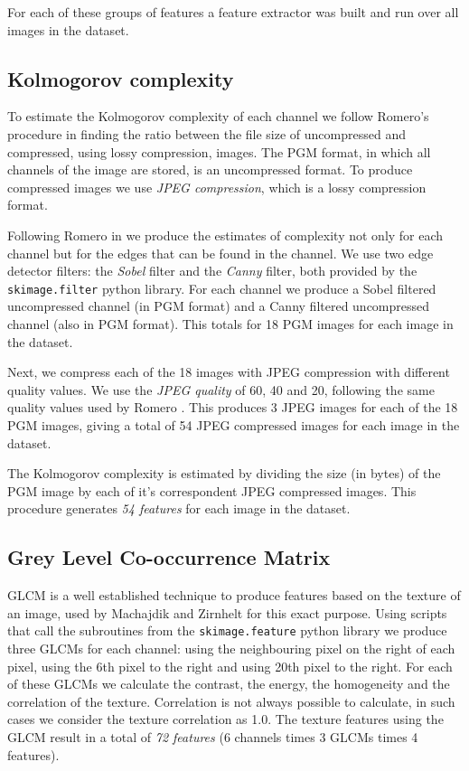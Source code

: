 \documentclass[11pt,a4paper,twoside,openright,draft]{report}
\begin{document}
\begin{multicols}{2}
For each of these groups of features a feature extractor was built and run over
all images in the dataset.

\subsection{Kolmogorov complexity}

To estimate the Kolmogorov complexity of each channel we follow Romero's
procedure \cite{jma12clas} in finding the ratio between the file size of
uncompressed and compressed, using lossy compression, images.  The PGM format,
in which all channels of the image are stored, is an uncompressed format.  To
produce compressed images we use \emph{JPEG compression}, which is a lossy
compression format.

Following Romero in \cite{jma12clas} we produce the estimates of complexity not
only for each channel but for the edges that can be found in the channel.  We
use two edge detector filters: the \emph{Sobel} filter and the \emph{Canny}
filter, both provided by the \texttt{skimage.filter} python library.  For each
channel we produce a Sobel filtered uncompressed channel (in PGM format) and a
Canny filtered uncompressed channel (also in PGM format).  This totals for 18
PGM images for each image in the dataset.

Next, we compress each of the 18 images with JPEG compression with different
quality values.  We use the \emph{JPEG quality} of 60, 40 and 20, following the
same quality values used by Romero \cite{jma12clas}.  This produces 3 JPEG
images for each of the 18 PGM images, giving a total of 54 JPEG compressed
images for each image in the dataset.

The Kolmogorov complexity is estimated by dividing the size (in bytes) of the
PGM image by each of it's correspondent JPEG compressed images.  This procedure
generates \emph{54 features} for each image in the dataset.


\subsection{Grey Level Co-occurrence Matrix}

GLCM is a well established technique to produce features based on the texture
of an image, used by Machajdik \cite{mach10clas} and Zirnhelt
\cite{zirnhelt07art} for this exact purpose.  Using scripts that call the
subroutines from the \texttt{skimage.feature} python library we produce three
GLCMs for each channel: using the neighbouring pixel on the right of each
pixel, using the 6th pixel to the right and using 20th pixel to the right.  For
each of these GLCMs we calculate the contrast, the energy, the homogeneity and
the correlation of the texture.  Correlation is not always possible to
calculate, in such cases we consider the texture correlation as 1.0.  The
texture features using the GLCM result in a total of \emph{72 features} (6
channels times 3 GLCMs times 4 features).


\end{multicols}
\end{document}
